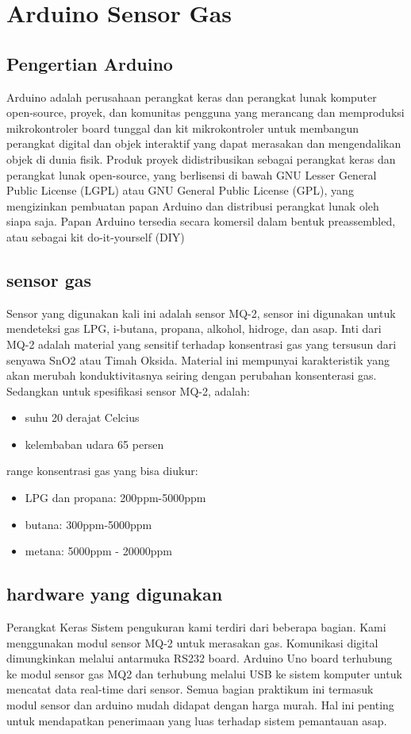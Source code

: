 \section{Arduino Sensor Gas}
\subsection{Pengertian Arduino}
Arduino adalah perusahaan perangkat keras dan perangkat lunak komputer open-source, proyek, dan komunitas pengguna yang merancang dan memproduksi mikrokontroler board tunggal dan kit mikrokontroler untuk membangun perangkat digital dan objek interaktif yang dapat merasakan dan mengendalikan objek di dunia fisik.
Produk proyek didistribusikan sebagai perangkat keras dan perangkat lunak open-source, yang berlisensi di bawah GNU Lesser General Public License (LGPL) atau GNU General Public License (GPL), yang mengizinkan pembuatan papan Arduino dan distribusi perangkat lunak oleh siapa saja. Papan Arduino tersedia secara komersil dalam bentuk preassembled, atau sebagai kit do-it-yourself (DIY)\cite{kushner2011making}
\subsection{sensor gas}
Sensor yang digunakan kali ini adalah sensor MQ-2, sensor ini digunakan untuk mendeteksi gas LPG, i-butana, propana, alkohol, hidroge, dan asap. Inti dari MQ-2 adalah material yang sensitif terhadap konsentrasi gas yang tersusun dari senyawa SnO2 atau Timah Oksida. Material ini mempunyai karakteristik yang akan merubah konduktivitasnya seiring dengan perubahan konsenterasi gas.
Sedangkan untuk spesifikasi sensor MQ-2, adalah:
\begin{itemize}
\item suhu 20 derajat Celcius
\item kelembaban udara 65 persen
\end{itemize}
range konsentrasi gas yang bisa diukur:
\begin{itemize}
\item LPG dan propana: 200ppm-5000ppm
\item butana: 300ppm-5000ppm
\item metana: 5000ppm - 20000ppm
\end{itemize}

\subsection{hardware yang digunakan}
Perangkat Keras Sistem pengukuran kami terdiri dari beberapa bagian. Kami menggunakan modul sensor MQ-2 untuk merasakan gas. Komunikasi digital dimungkinkan melalui antarmuka RS232 board. Arduino Uno board terhubung ke modul sensor gas MQ2 dan terhubung melalui USB ke sistem komputer untuk mencatat data real-time dari sensor. Semua bagian praktikum ini termasuk modul sensor dan arduino mudah didapat dengan harga murah. Hal ini penting untuk mendapatkan penerimaan yang luas terhadap sistem pemantauan asap.
	
